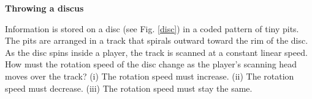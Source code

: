\documentclass[]{beamer}
\begin{document}



  \begin{frame}
    \textbf{Throwing a discus}   
    \vspace{5mm}


 Information is stored on a
  disc (see Fig. \ref{disc}) in a coded pattern of tiny pits. The pits are arranged in a track
  that spirals outward toward the rim of the disc. As the disc spins inside a player,
  the track is scanned at a constant linear speed. How must the rotation speed of the disc
  change as the player’s scanning head moves over the track? (i) The rotation speed must
  increase. (ii) The rotation speed must decrease. (iii) The rotation speed must stay the
  same.





\end{frame}

    









 
\end{document}
